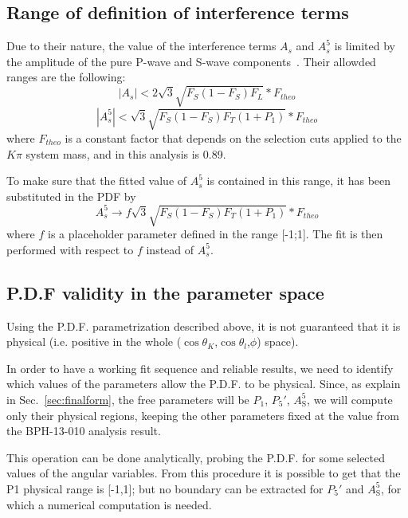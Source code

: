 \subsection{Range of definition of interference terms}
\label{sec:As5.range}
Due to their nature, the value of the interference terms $A_s$ and $A_s^5$ is limited by the amplitude of the pure P-wave and S-wave components~\cite{Genon:Swave}. Their allowded ranges are the following:
\begin{equation} \label{eq:As.range}
  |A_s|<2\sqrt{3}\sqrt{F_S(1-F_S)F_L}*F_{theo}
\end{equation}
\begin{equation} \label{eq:As5.range}
  |A^5_s|<\sqrt{3}\sqrt{F_S(1-F_S)F_T(1+P_1)}*F_{theo}
\end{equation}
where $F_{theo}$ is a constant factor that depends on the selection cuts applied to the $K\pi$ system mass, and in this analysis is 0.89.

To make sure that the fitted value of $A_s^5$ is contained in this range, it has been substituted in the PDF by
\begin{equation} \label{eq:As5.subst}
  A^5_s\to f\sqrt{3}\sqrt{F_S(1-F_S)F_T(1+P_1)}*F_{theo}
\end{equation}
where $f$ is a placeholder parameter defined in the range [-1;1]. The fit is then performed with respect to $f$ instead of $A_s^5$.

\subsection{P.D.F validity in the parameter space}
\label{sec:phys.bound}
Using the P.D.F. parametrization described above, it is not guaranteed that it is physical (i.e. positive in the whole ($\cos\theta_K$,$\cos\theta_l$,$\phi$) space).

In order to have a working fit sequence and reliable results, we need to identify which values of the parameters allow the P.D.F. to be physical. Since, as explain in Sec.~\ref{sec:finalform}, the free parameters will be $P_1$, $P_5'$, $A^5_\mathrm{S}$, we will compute only their physical regions, keeping the other parameters fixed at the value from the BPH-13-010 analysis result.

This operation can be done analytically, probing the P.D.F. for some selected values of the angular variables. From this procedure it is possible to get that the P1 physical range is [-1,1]; but no boundary can be extracted for $P_5'$ and $A^5_\mathrm{S}$, for which a numerical computation is needed.

